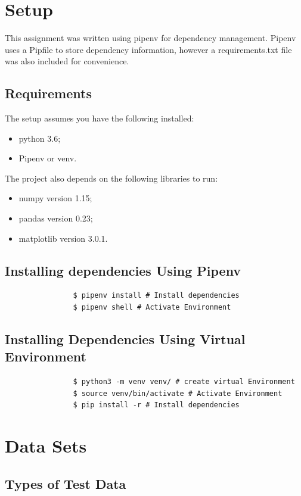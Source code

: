 \documentclass[11pt, a4paper]{article}
\begin{document}
    \section{Setup}
        This assignment was written using pipenv for dependency management. Pipenv uses a Pipfile to store dependency information, however a requirements.txt file was also included for convenience.
        \subsection{Requirements}
        The setup assumes you have the following installed:
        \begin{itemize}
            \item python 3.6;
            \item Pipenv or venv.
        \end{itemize}
        The project also depends on the following libraries to run:
        \begin{itemize}
            \item numpy version 1.15;
            \item pandas version 0.23;
            \item matplotlib version 3.0.1.
        \end{itemize}
        \subsection{Installing dependencies Using Pipenv}
            \begin{verbatim}
                $ pipenv install # Install dependencies
                $ pipenv shell # Activate Environment
            \end{verbatim}
        \subsection{Installing Dependencies Using Virtual Environment}
            \begin{verbatim}
                $ python3 -m venv venv/ # create virtual Environment
                $ source venv/bin/activate # Activate Environment
                $ pip install -r # Install dependencies
            \end{verbatim}
    \section{Data Sets}
        \subsection{Types of Test Data}
\end{document}
